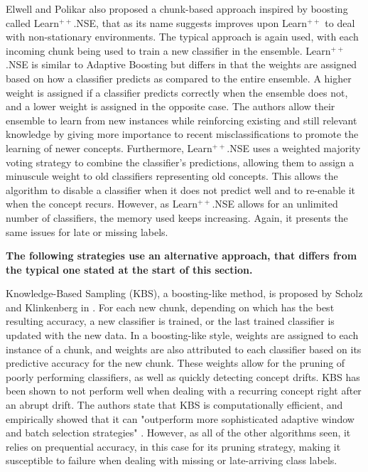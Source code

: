Elwell and Polikar also proposed a chunk-based approach inspired by boosting called \cite{elwell2011incremental} Learn$^{++}$.NSE, that as its name suggests improves upon Learn$^{++}$ to deal with non-stationary environments. The typical approach is again used, with each incoming chunk being used to train a new classifier in the ensemble. Learn$^{++}$.NSE is similar to Adaptive Boosting but differs in that the weights are assigned based on how a classifier predicts as compared to the entire ensemble. A higher weight is assigned if a classifier predicts correctly when the ensemble does not, and a lower weight is assigned in the opposite case. The authors allow their ensemble to learn from new instances while reinforcing existing and still relevant knowledge by giving more importance to recent misclassifications to promote the learning of newer concepts. Furthermore, Learn$^{++}$.NSE uses a weighted majority voting strategy to combine the classifier's predictions, allowing them to assign a minuscule weight to old classifiers representing old concepts. This allows the algorithm to disable a classifier when it does not predict well and to re-enable it when the concept recurs. However, as Learn$^{++}$.NSE allows for an unlimited number of classifiers, the memory used keeps increasing. Again, it presents the same issues for late or missing labels.

\textbf{The following strategies use an alternative approach, that differs from the typical one stated at the start of this section.}

Knowledge-Based Sampling (KBS), a boosting-like method, is proposed by Scholz and Klinkenberg in \cite{scholz2005ensemble}. For each new chunk, depending on which has the best resulting accuracy, a new classifier is trained, or the last trained classifier is updated with the new data. In a boosting-like style, weights are assigned to each instance of a chunk, and weights are also attributed to each classifier based on its predictive accuracy for the new chunk. These weights allow for the pruning of poorly performing classifiers, as well as quickly detecting concept drifts. KBS has been shown to not perform well when dealing with a recurring concept right after an abrupt drift. The authors state that KBS is computationally efficient, and empirically showed that it can "outperform more sophisticated adaptive window and batch selection strategies" \cite{scholz2005ensemble}. However, as all of the other algorithms seen, it relies on prequential accuracy, in this case for its pruning strategy, making it susceptible to failure when dealing with missing or late-arriving class labels.


